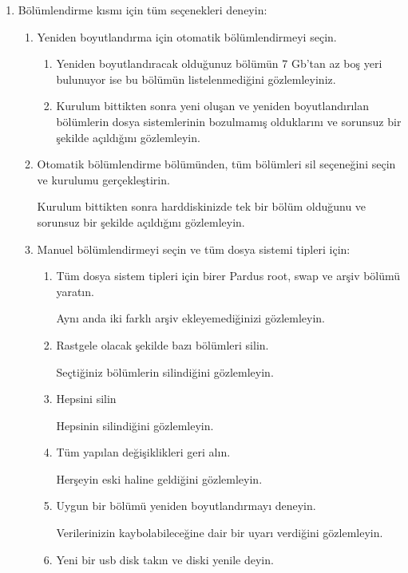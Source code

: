 \documentclass[a4paper,10pt]{article}
\begin{document}
\begin{enumerate}
\begin{enumerate}
\end{enumerate}
\item Bölümlendirme kısmı için tüm seçenekleri deneyin:
    \begin{enumerate}
        \item Yeniden boyutlandırma için otomatik bölümlendirmeyi seçin. 
        \begin{enumerate}
            \item Yeniden boyutlandıracak olduğunuz bölümün 7 Gb'tan az boş yeri bulunuyor ise bu bölümün listelenmediğini gözlemleyiniz.
            \item Kurulum bittikten sonra yeni oluşan ve yeniden boyutlandırılan bölümlerin dosya sistemlerinin bozulmamış olduklarını ve sorunsuz bir şekilde açıldığını gözlemleyin.


        \end{enumerate}
        \item Otomatik bölümlendirme bölümünden, tüm bölümleri sil seçeneğini seçin ve kurulumu gerçekleştirin.
	
	Kurulum bittikten sonra harddiskinizde tek bir bölüm olduğunu ve sorunsuz bir şekilde açıldığını gözlemleyin.

        \item Manuel bölümlendirmeyi seçin ve tüm dosya sistemi tipleri için:
        \begin{enumerate}
            \item Tüm dosya sistem tipleri için birer Pardus root, swap ve arşiv bölümü yaratın.

		Aynı anda iki farklı arşiv ekleyemediğinizi gözlemleyin.
	    \item Rastgele olacak şekilde bazı bölümleri silin.
		
		Seçtiğiniz bölümlerin silindiğini gözlemleyin.
            \item Hepsini silin
	
		Hepsinin silindiğini gözlemleyin.
            \item Tüm yapılan değişiklikleri geri alın.
	
		Herşeyin eski haline geldiğini gözlemleyin.
            \item Uygun bir bölümü yeniden boyutlandırmayı deneyin.
	
		Verilerinizin kaybolabileceğine dair bir uyarı verdiğini gözlemleyin. 
            \item Yeni bir usb disk takın ve diski yenile deyin.


\end{enumerate}
\end{enumerate}
\end{enumerate}
\end{document}

